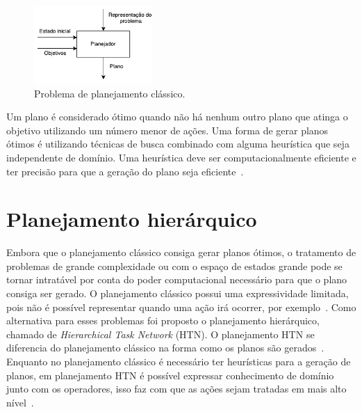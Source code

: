\begin{figure}[ht]
	\centering
	\includegraphics[width=0.4\textwidth]{fig/modelo.pdf}
	\caption{Problema de planejamento clássico.}
	\label{fig:planmodelo}
\end{figure} 

Um plano é considerado ótimo quando não há nenhum outro plano que atinga o objetivo utilizando um número menor de ações.
Uma forma de gerar planos ótimos é utilizando técnicas de busca combinado com alguma heurística que seja independente de domínio.
Uma heurística deve ser computacionalmente eficiente e ter precisão para que a geração do plano seja eficiente~\cite{helmert2007flexible}.

\section{Planejamento hierárquico} 

Embora que o planejamento clássico consiga gerar planos ótimos, o tratamento de problemas de grande complexidade ou com o espaço de estados grande pode se tornar intratável por conta do poder computacional necessário para que o plano consiga ser gerado.
O planejamento clássico possui uma expressividade limitada, pois não é possível representar quando uma ação irá ocorrer, por exemplo~\cite{intelligence2003modern}.
Como alternativa para esses problemas foi proposto o planejamento hierárquico, chamado de \textit{Hierarchical Task Network} (HTN). 
O planejamento HTN se diferencia do planejamento clássico na forma como os planos são gerados~\cite{ghallab2004automated}. 
Enquanto no planejamento clássico é necessário ter heurísticas para a geração de planos, em planejamento HTN é possível expressar conhecimento de domínio junto com os operadores, isso faz com que as ações sejam tratadas em mais alto nível~\cite{intelligence2003modern}.  


